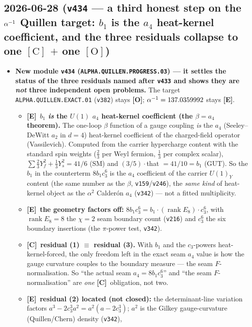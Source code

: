 \documentclass[11pt]{article}
\providecommand{\mE}{\textbf{[E]}}\providecommand{\mC}{\textbf{[C]}}
\providecommand{\mO}{\textbf{[O]}}\providecommand{\mX}{\textbf{[X]}}
\providecommand{\vref}[1]{\texttt{#1}}
\providecommand{\cthree}{c_3}\providecommand{\phiz}{\varphi_0^{\mathrm{ret}}}
\begin{document}
\subsection*{2026-06-28 (\texttt{v434} --- a third honest step on the $\alpha^{-1}$ Quillen target: $b_1$ is the $a_4$ heat-kernel coefficient, and the three residuals collapse to one $\mathrm{[C]}$ $+$ one $\mathrm{[O]}$)}
\begin{itemize}
\item \textbf{New module \texttt{v434} (\texttt{ALPHA.QUILLEN.PROGRESS.03}) --- it settles the status of the
three residuals named after \vref{v433} and shows they are \emph{not} three independent open problems.} The
target \texttt{ALPHA.QUILLEN.EXACT.01} (\vref{v382}) stays \mO; $\alpha^{-1}=137.0359992$ stays \mE.
\begin{itemize}
\item \mE\ \textbf{$b_1$ \emph{is} the $U(1)$ $a_4$ heat-kernel coefficient (the $\beta=a_4$ theorem).} The
one-loop $\beta$ function of a gauge coupling \emph{is} the $a_4$ (Seeley--DeWitt $a_2$ in $d{=}4$) heat-kernel
coefficient of the charged-field operator (Vassilevich). Computed from the carrier hypercharge content with the
standard spin weights ($\tfrac23$ per Weyl fermion, $\tfrac13$ per complex scalar),
$\sum\tfrac23 Y_f^2+\tfrac13 Y_s^2 = 41/6$ (SM) and $(3/5)\cdot{}$that $=41/10=b_1$ (GUT). So the $b_1$ in the
counterterm $8b_1\cthree^6$ is the $a_4$ coefficient of the carrier $U(1)_Y$ content (the same number as the
$\beta$, \vref{v159}/\vref{v246}), the \emph{same kind} of heat-kernel object as the $\alpha^2$ Calder\'on $a_4$
(\vref{v342}) --- not a fitted multiplicity.
\item \mE\ \textbf{the geometry factors off:} $8b_1\cthree^6=b_1\cdot(\operatorname{rank}E_8)\cdot\cthree^6$, with
$\operatorname{rank}E_8=8$ the $\chi{=}2$ seam boundary count (\vref{v216}) and $\cthree^6$ the six boundary
insertions (the $\pi$-power test, \vref{v342}).
\item \mC\ \textbf{residual (1) $\equiv$ residual (3).} With $b_1$ and the $\cthree$-powers heat-kernel-forced,
the only freedom left in the exact seam $a_4$ value is how the gauge curvature couples to the boundary measure ---
the seam $F$-normalisation. So ``the actual seam $a_4=8b_1\cthree^6$'' and ``the seam $F$-normalisation'' are
\emph{one} \mC\ obligation, not two.
\item \mE\ \textbf{residual (2) located (not closed):} the determinant-line variation factors
$a^3-2\cthree^3 a^2 = a^2(a-2\cthree^3)$; $a^2$ is the Gilkey gauge-curvature (Quillen/Chern) density (\vref{v342}),

\end{itemize}
\end{itemize}
\end{document}
